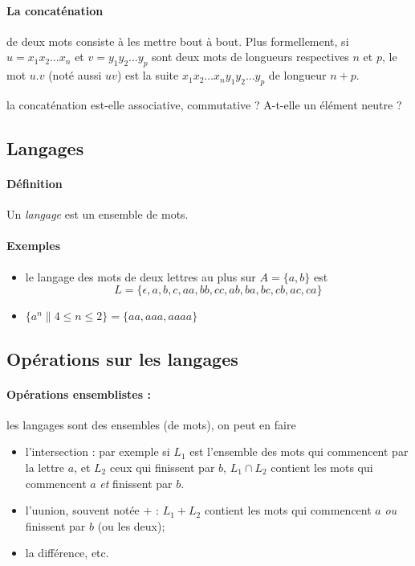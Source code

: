 \paragraph{La concaténation} de deux mots consiste à les mettre bout à bout. Plus formellement,
si $u = x_1 x_2 \ldots x_n$ et $v = y_1 y_2 \ldots y_p$ sont deux mots
de longueurs respectives $n$ et $p$, le mot $u.v$ (noté aussi $uv$)
est la suite $ x_1 x_2 \ldots x_n y_1 y_2 \ldots y_p$ de longueur
$n+p$.

\manicule la concaténation est-elle associative, commutative ?
A-t-elle un élément neutre ?

\subsection{Langages}

\paragraph{Définition} Un \emph{langage} est un ensemble de mots.

\paragraph{Exemples} 
\begin{itemize} 
\item le langage des mots de deux lettres au plus sur $A = \{a, b\}$
  est $$L = \{ \epsilon, a, b, c, aa, bb, cc, ab, ba, bc, cb, ac, ca
  \}$$
\item $ \{ a^n \| 4\leq n\leq 2\} = \{ aa, aaa, aaaa \}$
\end{itemize}

\subsection{Opérations sur les langages}

\paragraph{Opérations ensemblistes : } les langages sont
 des ensembles (de mots), on peut en faire
\begin{itemize}
\item l'intersection : par exemple si $L_1$ est l'ensemble des mots
  qui commencent par la lettre $a$, et $L_2$ ceux qui finissent par
  $b$, $L_1 \cap L_2$ contient les mots qui commencent $a$ \emph{et}
  finissent par $b$.
\item l'uunion, souvent notée $+$ : $L_1 + L_2$ contient les mots qui
  commencent $a$ \emph{ou} finissent par $b$ (ou les deux);
\item la différence, etc.
\end{itemize}

